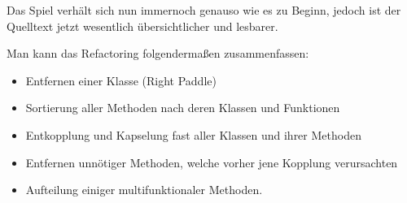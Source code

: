 \documentclass{pi1}
\begin{document}
Das Spiel verhält sich nun immernoch genauso wie es zu Beginn, jedoch ist der Quelltext jetzt wesentlich übersichtlicher und lesbarer.\newline

Man kann das Refactoring folgendermaßen zusammenfassen:
\begin{itemize}


\item Entfernen einer Klasse (Right Paddle)
\item Sortierung aller Methoden nach deren Klassen und Funktionen
\item Entkopplung und Kapselung fast aller Klassen und ihrer Methoden
\item Entfernen unnötiger Methoden, welche vorher jene Kopplung verursachten
\item Aufteilung einiger multifunktionaler Methoden.
\end{itemize}
\end{document}
